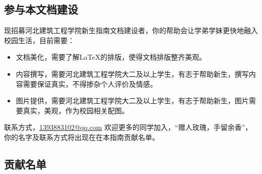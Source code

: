 \documentclass[12pt]{article} %
\begin{document}
\subsection*{参与本文档建设}

现招募河北建筑工程学院新生指南文档建设者，你的帮助会让学弟学妹更快地融入校园生活，目前需要：
\begin{itemize}
	\item 文档美化，需要了解\LaTeX 的排版，使得文档排版整齐美观。
	\item 内容撰写，需要河北建筑工程学院大二及以上学生，有志于帮助新生，撰写内容需要保证真实，不得掺杂个人评价及情感。
	\item 图片提供，需要河北建筑工程学院大二及以上学生，有志于帮助新生，图片需要真实，美观，作为校园相关配图。
\end{itemize}

联系方式，\href{mailto:1393883102@qq.com}{1393883102@qq.com}
欢迎更多的同学加入，“赠人玫瑰，手留余香”，你的名字及联系方式将出现在在本指南贡献名单。

\subsection*{贡献名单}
\end{document}
